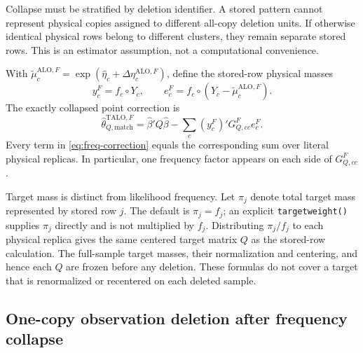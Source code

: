 \documentclass[11pt]{article}
\newcommand{\TALO}{\mathrm{TALO}}
\newcommand{\ALO}{\mathrm{ALO}}
\begin{document}
Collapse must be stratified by deletion identifier. A stored pattern cannot
represent physical copies assigned to different all-copy deletion units. If
otherwise identical physical rows belong to different clusters, they remain
separate stored rows. This is an estimator assumption, not a computational
convenience.

With $\widetilde\mu_c^{\ALO,F}=\exp(\widehat\eta_c+
\Delta\eta_c^{\ALO,F})$, define the stored-row physical masses
\[
 y_c^F=f_c\circ Y_c,\qquad
 e_c^F=f_c\circ(Y_c-\widetilde\mu_c^{\ALO,F}).
\]
The exactly collapsed point correction is
\begin{equation}
 \widehat\theta_{Q,\mathrm{match}}^{\TALO,F}
 =\widehat\beta'Q\widehat\beta-
   \sum_c (y_c^F)'G_{Q,cc}^F e_c^F .                    \label{eq:freq-correction}
\end{equation}
Every term in \eqref{eq:freq-correction} equals the corresponding sum over
literal physical replicas. In particular, one frequency factor appears on
each side of $G_{Q,cc}^F$.

Target mass is distinct from likelihood frequency. Let $\pi_j$ denote total
target mass represented by stored row $j$. The default is $\pi_j=f_j$; an
explicit \texttt{targetweight()} supplies $\pi_j$ directly and is not
multiplied by $f_j$. Distributing $\pi_j/f_j$ to each physical replica gives
the same centered target matrix $Q$ as the stored-row calculation.
The full-sample target masses, their normalization and centering, and hence
each $Q$ are frozen before any deletion. These formulas do not cover a target
that is renormalized or recentered on each deleted sample.

\subsection{One-copy observation deletion after frequency collapse}
\end{document}

